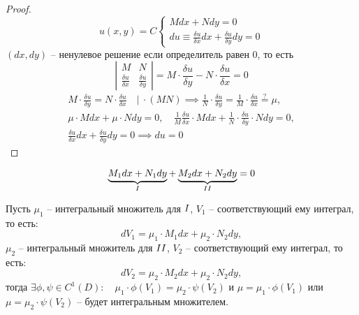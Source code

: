 \begin{proof}
    \[
        u(x,y) = C\left\{\begin{array}{l}
            Mdx + Ndy = 0 \\
            du \equiv \frac{\delta u}{\delta x}dx + \frac{\delta u}{\delta y}dy = 0
        \end{array}\right.
    \]
    $(dx,dy)$ -- ненулевое решение если определитель равен 0, то есть
    \[
        \left|\begin{array}{cc}
            M                         & N                         \\
            \frac{\delta u}{\delta x} & \frac{\delta u}{\delta y}
        \end{array}\right| = M\cdot \frac{\delta u}{\delta y} - N\cdot \frac{\delta u}{\delta x} = 0
    \]
    \begin{multline*}
        M\cdot \frac{\delta u}{\delta y} = N\cdot \frac{\delta u}{\delta x} \quad \bigg| \ \cdot (MN) \implies \frac{1}{N}\cdot \frac{\delta u}{\delta y} = \frac{1}{M} \cdot \frac{\delta u}{\delta x} \overset{?}{=} \mu, \\
        \mu \cdot Mdx + \mu \cdot Ndy = 0, \quad \frac{1}{M} \frac{\delta u}{\delta x} \cdot Mdx + \frac{1}{N} \cdot \frac{\delta u}{\delta y} \cdot Ndy = 0, \\
        \frac{\delta u}{\delta x}dx + \frac{\delta u}{\delta y}dy = 0 \implies du = 0
    \end{multline*}
\end{proof}

\begin{note}
    \[
        \underbrace{M_1dx + N_1dy}_{\RomanNumeralCaps{1}} + \underbrace{M_2dx + N_2dy}_{\RomanNumeralCaps{2}} = 0
    \]

    Пусть $\mu_1$ -- интегральный множитель для $\RomanNumeralCaps{1}$, $V_1$ -- соответствующий ему интеграл, то есть:
    \[
        dV_1 = \mu_1 \cdot M_1 dx + \mu_2 \cdot N_2 dy,
    \]
    $\mu_2$ -- интегральный множитель для $\RomanNumeralCaps{2}$, $V_2$ -- соответствующий ему интеграл, то есть:
    \[
        dV_2 = \mu_2 \cdot M_2 dx + \mu_2 \cdot N_2 dy,
    \]
    тогда $\exists \phi,\psi \in C^1(D): \quad \mu_1 \cdot \phi(V_1) = \mu_2 \cdot \psi(V_2)$ и $\mu = \mu_1 \cdot \phi (V_1)$ или $\mu = \mu_2 \cdot \psi(V_2)$ -- будет интегральным множителем.
\end{note}

